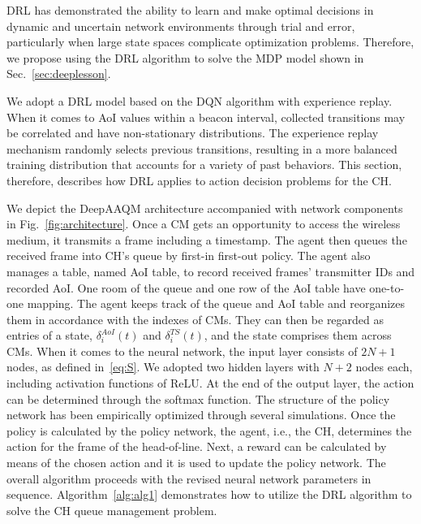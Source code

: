 \documentclass[journal]{IEEEtran}
\begin{document}
DRL has demonstrated the ability to learn and make optimal decisions in dynamic and uncertain network environments through trial and error, particularly when large state spaces complicate optimization problems. Therefore, we propose using the DRL algorithm to solve the MDP model shown in Sec.~\ref{sec:deeplesson}.

We adopt a DRL model based on the DQN algorithm with experience replay\cite{lin1992reinforcement}. When it comes to AoI values within a beacon interval, collected transitions may be correlated and have non-stationary distributions. The experience replay mechanism randomly selects previous transitions, resulting in a more balanced training distribution that accounts for a variety of past behaviors. This section, therefore, describes how DRL applies to action decision problems for the CH.

We depict the DeepAAQM architecture accompanied with network components in Fig.~\ref{fig:architecture}. Once a CM gets an opportunity to access the wireless medium, it transmits a frame including a timestamp. The agent then queues the received frame into CH's queue by first-in first-out policy. The agent also manages a table, named AoI table, to record received frames' transmitter IDs and recorded AoI. One room of the queue and one row of the AoI table have one-to-one mapping. The agent keeps track of the queue and AoI table and reorganizes them in accordance with the indexes of CMs. They can then be regarded as entries of a state, $\delta^{AoI}_{i}(t)$ and $\delta^{TS}_{i}(t)$, and the state comprises them across CMs. When it comes to the neural network, the input layer consists of $2N+1$ nodes, as defined in~\eqref{eq:S}. We adopted two hidden layers with $N+2$ nodes each, including activation functions of ReLU. At the end of the output layer, the action can be determined through the softmax function. The structure of the policy network has been empirically optimized through several simulations. Once the policy is calculated by the policy network, the agent, i.e., the CH, determines the action for the frame of the head-of-line. Next, a reward can be calculated by means of the chosen action and it is used to update the policy network. The overall algorithm proceeds with the revised neural network parameters in sequence. Algorithm~\ref{alg:alg1} demonstrates how to utilize the DRL algorithm to solve the CH queue management problem.
\end{document}
